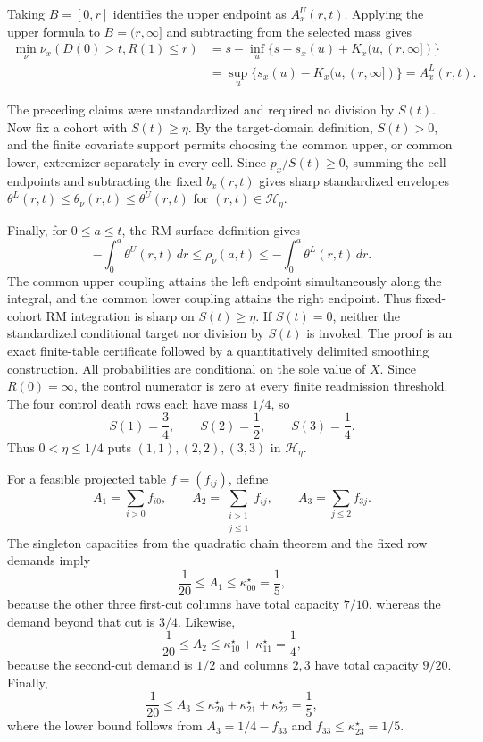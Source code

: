 Taking \(B=[0,r]\) identifies the upper endpoint as \(A_x^U(r,t)\).  Applying the upper formula to \(B=(r,\infty]\) and subtracting from the selected mass gives
\[
\begin{aligned}
\min_\nu\nu_x(D(0)>t,R(1)\leq r)
&=s-\inf_u\{s-s_x(u)+K_x(u,(r,\infty])\}\\
&=\sup_u\{s_x(u)-K_x(u,(r,\infty])\}
=A_x^L(r,t).                                                         \tag{17}
\end{aligned}
\]

The preceding claims were unstandardized and required no division by \(S(t)\).  Now fix a cohort with \(S(t)\geq\eta\).  By the target-domain definition, \(S(t)>0\), and the finite covariate support permits choosing the common upper, or common lower, extremizer separately in every cell.  Since \(p_x/S(t)\geq0\), summing the cell endpoints and subtracting the fixed \(b_x(r,t)\) gives sharp standardized envelopes \(\theta^L(r,t)\leq\theta_\nu(r,t)\leq\theta^U(r,t)\) for \((r,t)\in\mathcal H_\eta\).

Finally, for \(0\leq a\leq t\), the RM-surface definition gives
\[
-\int_0^a\theta^U(r,t)\,dr
\leq\rho_\nu(a,t)\leq
-\int_0^a\theta^L(r,t)\,dr.                                        \tag{18}
\]
The common upper coupling attains the left endpoint simultaneously along the integral, and the common lower coupling attains the right endpoint.  Thus fixed-cohort RM integration is sharp on \(S(t)\geq\eta\).  If \(S(t)=0\), neither the standardized conditional target nor division by \(S(t)\) is invoked.
The proof is an exact finite-table certificate followed by a quantitatively delimited smoothing construction.  All probabilities are conditional on the sole value of \(X\).  Since \(R(0)=\infty\), the control numerator is zero at every finite readmission threshold.  The four control death rows each have mass \(1/4\), so
\[
S(1)=\frac34,\qquad S(2)=\frac12,\qquad S(3)=\frac14.                \tag{19}
\]
Thus \(0<\eta\leq1/4\) puts \((1,1),(2,2),(3,3)\) in \(\mathcal H_\eta\).

For a feasible projected table \(f=(f_{ij})\), define
\[
A_1=\sum_{i>0}f_{i0},\qquad
A_2=\sum_{\substack{i>1\\j\leq1}}f_{ij},\qquad
A_3=\sum_{j\leq2}f_{3j}.
\]
The singleton capacities from the quadratic chain theorem and the fixed row demands imply
\[
\frac1{20}\leq A_1\leq\kappa^\star_{00}=\frac15,                    \tag{20}
\]
because the other three first-cut columns have total capacity \(7/10\), whereas the demand beyond that cut is \(3/4\).  Likewise,
\[
\frac1{20}\leq A_2\leq\kappa^\star_{10}+\kappa^\star_{11}=\frac14,  \tag{21}
\]
because the second-cut demand is \(1/2\) and columns \(2,3\) have total capacity \(9/20\).  Finally,
\[
\frac1{20}\leq A_3\leq
\kappa^\star_{20}+\kappa^\star_{21}+\kappa^\star_{22}=\frac15,      \tag{22}
\]
where the lower bound follows from \(A_3=1/4-f_{33}\) and \(f_{33}\leq\kappa^\star_{23}=1/5\).

